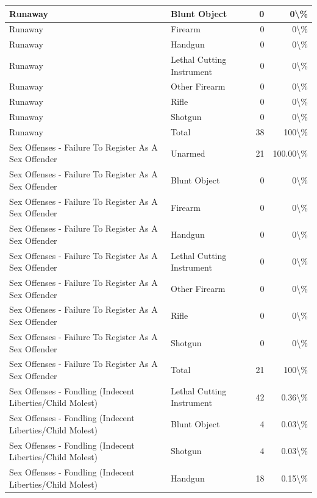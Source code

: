 \documentclass[
]{krantz}
\begin{document}
\begin{longtable}[t]{l|l|r|r}
\hline
Runaway & Blunt Object & 0 & 0\textbackslash{}\%\\
\hline
Runaway & Firearm & 0 & 0\textbackslash{}\%\\
\hline
Runaway & Handgun & 0 & 0\textbackslash{}\%\\
\hline
Runaway & Lethal Cutting Instrument & 0 & 0\textbackslash{}\%\\
\hline
Runaway & Other Firearm & 0 & 0\textbackslash{}\%\\
\hline
Runaway & Rifle & 0 & 0\textbackslash{}\%\\
\hline
Runaway & Shotgun & 0 & 0\textbackslash{}\%\\
\hline
Runaway & Total & 38 & 100\textbackslash{}\%\\
\hline
Sex Offenses - Failure To Register As A Sex Offender & Unarmed & 21 & 100.00\textbackslash{}\%\\
\hline
Sex Offenses - Failure To Register As A Sex Offender & Blunt Object & 0 & 0\textbackslash{}\%\\
\hline
Sex Offenses - Failure To Register As A Sex Offender & Firearm & 0 & 0\textbackslash{}\%\\
\hline
Sex Offenses - Failure To Register As A Sex Offender & Handgun & 0 & 0\textbackslash{}\%\\
\hline
Sex Offenses - Failure To Register As A Sex Offender & Lethal Cutting Instrument & 0 & 0\textbackslash{}\%\\
\hline
Sex Offenses - Failure To Register As A Sex Offender & Other Firearm & 0 & 0\textbackslash{}\%\\
\hline
Sex Offenses - Failure To Register As A Sex Offender & Rifle & 0 & 0\textbackslash{}\%\\
\hline
Sex Offenses - Failure To Register As A Sex Offender & Shotgun & 0 & 0\textbackslash{}\%\\
\hline
Sex Offenses - Failure To Register As A Sex Offender & Total & 21 & 100\textbackslash{}\%\\
\hline
Sex Offenses - Fondling (Indecent Liberties/Child Molest) & Lethal Cutting Instrument & 42 & 0.36\textbackslash{}\%\\
\hline
Sex Offenses - Fondling (Indecent Liberties/Child Molest) & Blunt Object & 4 & 0.03\textbackslash{}\%\\
\hline
Sex Offenses - Fondling (Indecent Liberties/Child Molest) & Shotgun & 4 & 0.03\textbackslash{}\%\\
\hline
Sex Offenses - Fondling (Indecent Liberties/Child Molest) & Handgun & 18 & 0.15\textbackslash{}\%\\

\end{longtable}
\end{document}

